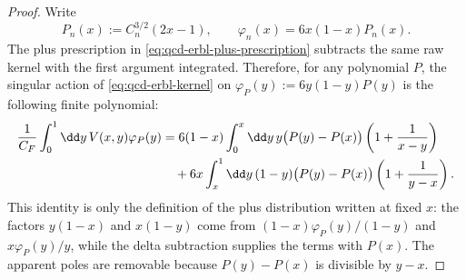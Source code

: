 \begin{proof}
Write
\[
  P_n(x):=C_n^{3/2}(2x-1),\qquad
  \varphi_n(x)=6x(1-x)P_n(x).
\]
The plus prescription in \eqref{eq:qcd-erbl-plus-prescription} subtracts the
same raw kernel with the first argument integrated.  Therefore, for any
polynomial \(P\), the singular action of \eqref{eq:qcd-erbl-kernel} on
\(\varphi_P(y):=6y(1-y)P(y)\) is the following finite polynomial:
\begin{align}
  \frac1{C_F}\int_0^1\dd y\,V(x,y)\varphi_P(y)
  &=
  6(1-x)\int_0^x\dd y\,y\bigl(P(y)-P(x)\bigr)
     \left(1+\frac1{x-y}\right)
     \notag\\
  &\quad
  +6x\int_x^1\dd y\,(1-y)\bigl(P(y)-P(x)\bigr)
     \left(1+\frac1{y-x}\right).
  \label{eq:qcd-erbl-finite-polynomial-action}
\end{align}
This identity is only the definition of the plus distribution written at fixed
\(x\): the factors \(y(1-x)\) and \(x(1-y)\) come from
\((1-x)\varphi_P(y)/(1-y)\) and \(x\varphi_P(y)/y\), while the delta
subtraction supplies the terms with \(P(x)\).  The apparent poles are
removable because \(P(y)-P(x)\) is divisible by \(y-x\).


\end{proof}
